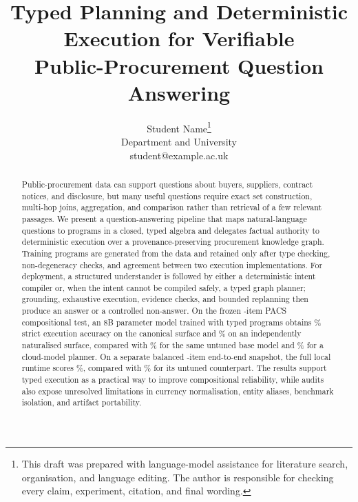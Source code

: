 \documentclass{article}
\title{Typed Planning and Deterministic Execution for Verifiable\\
Public-Procurement Question Answering}
\author{%
  \name Student Name\thanks{This draft was prepared with language-model assistance for
  literature search, organisation, and language editing.  The author is responsible for
  checking every claim, experiment, citation, and final wording.}\\
  \addr Department and University\\
  \email student@example.ac.uk
}
\begin{document}
\maketitle

\begin{abstract}
Public-procurement data can support questions about buyers, suppliers, contract notices,
and disclosure, but many useful questions require exact set construction, multi-hop joins,
aggregation, and comparison rather than retrieval of a few relevant passages.  We present a
question-answering pipeline that maps natural-language questions to programs in a closed,
typed algebra and delegates factual authority to deterministic execution over a
provenance-preserving procurement knowledge graph.  Training programs are generated from the
data and retained only after type checking, non-degeneracy checks, and agreement between two
execution implementations.  For deployment, a structured understander is followed by either a
deterministic intent compiler or, when the intent cannot be compiled safely, a typed graph
planner; grounding, exhaustive execution, evidence checks, and bounded replanning then produce
an answer or a controlled non-answer.  On the frozen \PacsN{}-item PACS compositional test, an
8B parameter model trained with typed programs obtains \PacsOursA\% strict execution accuracy
on the canonical surface and \PacsOursB\% on an independently naturalised surface, compared
with \PacsBaseA\% for the same untuned base model and \PacsTeacherA\% for a cloud-model
planner.  On a separate balanced \RuntimeN{}-item end-to-end snapshot, the full local runtime
scores \RuntimeOurs\%, compared with \RuntimeBase\% for its untuned counterpart.  The results
support typed execution as a practical way to improve compositional reliability, while audits
also expose unresolved limitations in currency normalisation, entity aliases, benchmark
isolation, and artifact portability.
\end{abstract}












\appendix





\end{document}
